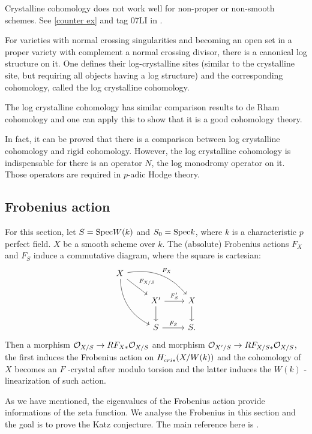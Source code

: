 \begin{remark}
    Crystalline cohomology does not work well for non-proper or non-smooth schemes. 
    See \ref{counter ex} and tag 07LI in \cite{Sta}.
\end{remark}

\begin{remark}
    For varieties with normal crossing singularities and 
    becoming an open set in a proper variety 
    with complement a normal crossing divisor, 
    there is a canonical log structure on it. 
    One defines their log-crystalline sites 
    (similar to the crystalline site, but requiring all objects having a log structure) 
    and the corresponding cohomology, called the log crystalline cohomology. 
    
    The log crystalline cohomology has similar comparison results to de Rham cohomology 
    and one can apply this to show that it is a good cohomology theory.

    In fact, it can be proved that 
    there is a comparison between log crystalline cohomology and rigid cohomology. 
    However, the log crystalline cohomology is indispensable for there is an operator $N$, 
    the log monodromy operator on it. 
    Those operators are required in $p$-adic Hodge theory.
\end{remark}

\subsection{Frobenius action}
For this section, let $S = \mathrm{Spec} W(k)$ and $S_0 = \mathrm{Spec} k$, 
where $k$ is a characteristic $p$ perfect field. 
$X$ be a smooth scheme over $k$. 
The (absolute) Frobenius actions $F_X$ and $F_S$ induce a commutative diagram, 
where the square is cartesian:
\[
    \begin{tikzcd}
        X \ar[ddr, bend right] \ar[dr, "{F_{X/S}}"] \ar[drr, "F_X", bend left] \\
        & X'\ar[r, "{F_S'}"] \ar[d] & X \ar[d]\\
        & S \ar[r, "{F_S}"] & S.
    \end{tikzcd}
\]
Then a morphism ${\mathcal {O}}_{X/S} \to RF_{X*} {\mathcal {O}}_{X/S}$ 
and morphism ${\mathcal {O}}_{X'/S} \to RF_{X/S*} {\mathcal {O}}_{X/S}$, 
the first induces the Frobenius action on $H^\cdot_{cris}(X/W(k))$ and the cohomology of $X$ 
becomes an $F$ -crystal after modulo torsion 
and the latter induces the $W(k)$ -linearization of such action.

As we have mentioned, the eigenvalues of the Frobenius action 
provide informations of the zeta function. 
We analyse the Frobenius in this section and the goal is to prove the Katz conjecture. 
The main reference here is \cite{BO}.

